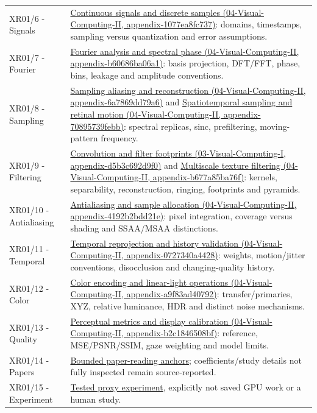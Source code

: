 {\begin{longtable}[]{@{}
  >{\raggedright\arraybackslash}p{}
  >{\raggedright\arraybackslash}p{}@{}}
XR01/6 - Signals & \href{}{Continuous signals and discrete samples (04-Visual-Computing-II, appendix-1077ea8fc737)}: domains, timestamps, sampling versus quantization and error assumptions. \\
XR01/7 - Fourier & \href{}{Fourier analysis and spectral phase (04-Visual-Computing-II, appendix-b60686ba06a1)}: basis projection, DFT/FFT, phase, bins, leakage and amplitude conventions. \\
XR01/8 - Sampling & \href{}{Sampling aliasing and reconstruction (04-Visual-Computing-II, appendix-6a7869dd79a6)} and \href{}{Spatiotemporal sampling and retinal motion (04-Visual-Computing-II, appendix-70895739febb)}: spectral replicas, sinc, prefiltering, moving-pattern frequency. \\
XR01/9 - Filtering & \href{}{Convolution and filter footprints (03-Visual-Computing-I, appendix-d5b3c692d9f0)} and \href{}{Multiscale texture filtering (04-Visual-Computing-II, appendix-b677a85ba76f)}: kernels, separability, reconstruction, ringing, footprints and pyramids. \\
XR01/10 - Antialiasing & \href{}{Antialiasing and sample allocation (04-Visual-Computing-II, appendix-4192b2bdd21e)}: pixel integration, coverage versus shading and SSAA/MSAA distinctions. \\
XR01/11 - Temporal & \href{}{Temporal reprojection and history validation (04-Visual-Computing-II, appendix-0727340a4428)}: weights, motion/jitter conventions, disocclusion and changing-quality history. \\
XR01/12 - Color & \href{}{Color encoding and linear-light operations (04-Visual-Computing-II, appendix-a9f83ad40792)}: transfer/primaries, XYZ, relative luminance, HDR and distinct noise mechanisms. \\
XR01/13 - Quality & \href{}{Perceptual metrics and display calibration (04-Visual-Computing-II, appendix-b2c1846508bf)}: reference, MSE/PSNR/SSIM, gaze weighting and model limits. \\
XR01/14 - Papers & \href{Continuous\%20Notes/University\%20-\%20Worlds,\%20Images\%20and\%20Inference\%20-\%20Graphics,\%20Vision\%20and\%20Photography\#Read\%20research\%20as\%20a\%20chain\%20of\%20questions,\%20methods\%20and\%20bounded\%20conclusions/}{Bounded paper-reading anchors}; coefficients/study details not fully inspected remain source-reported. \\
XR01/15 - Experiment & \href{Continuous\%20Notes/University\%20-\%20Worlds,\%20Images\%20and\%20Inference\%20-\%20Graphics,\%20Vision\%20and\%20Photography\#Complete\%20numerical\%20and\%20image-space\%20laboratory/}{Tested proxy experiment}, explicitly not saved GPU work or a human study. \\

\end{longtable}}
